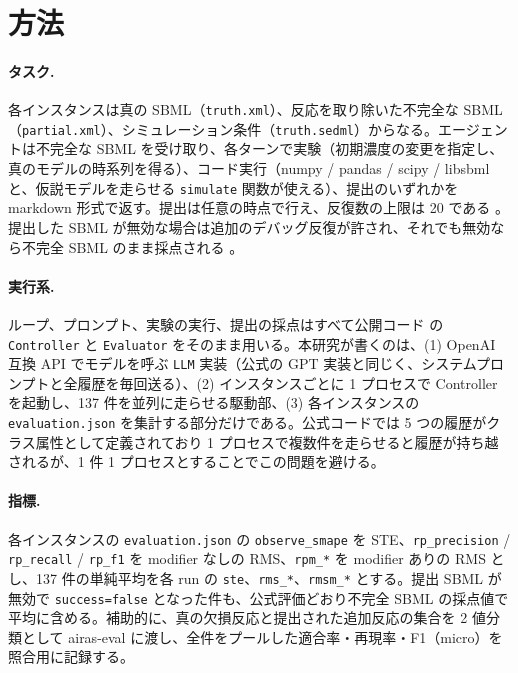 \documentclass{article}
\begin{document}
\section{方法}
\label{sec:method}
\paragraph{タスク.}
各インスタンスは真の SBML（\texttt{truth.xml}）、反応を取り除いた不完全な SBML（\texttt{partial.xml}）、シミュレーション条件（\texttt{truth.sedml}）からなる。エージェントは不完全な SBML を受け取り、各ターンで実験（初期濃度の変更を指定し、真のモデルの時系列を得る）、コード実行（numpy / pandas / scipy / libsbml と、仮説モデルを走らせる \texttt{simulate} 関数が使える）、提出のいずれかを markdown 形式で返す。提出は任意の時点で行え、反復数の上限は 20 である \cite[s1.p3]{duan-2025-measuring}。提出した SBML が無効な場合は追加のデバッグ反復が許され、それでも無効なら不完全 SBML のまま採点される \cite[s1.p4]{duan-2025-measuring}。

\paragraph{実行系.}
ループ、プロンプト、実験の実行、提出の採点はすべて公開コード \citep{h4duan-2025-scigym} の \texttt{Controller} と \texttt{Evaluator} をそのまま用いる。本研究が書くのは、(1) OpenAI 互換 API でモデルを呼ぶ \texttt{LLM} 実装（公式の GPT 実装と同じく、システムプロンプトと全履歴を毎回送る）、(2) インスタンスごとに 1 プロセスで Controller を起動し、137 件を並列に走らせる駆動部、(3) 各インスタンスの \texttt{evaluation.json} を集計する部分だけである。公式コードでは 5 つの履歴がクラス属性として定義されており 1 プロセスで複数件を走らせると履歴が持ち越されるが、1 件 1 プロセスとすることでこの問題を避ける。

\paragraph{指標.}
各インスタンスの \texttt{evaluation.json} の \texttt{observe\_smape} を STE、\texttt{rp\_precision} / \texttt{rp\_recall} / \texttt{rp\_f1} を modifier なしの RMS、\texttt{rpm\_*} を modifier ありの RMS とし、137 件の単純平均を各 run の \texttt{ste}、\texttt{rms\_*}、\texttt{rmsm\_*} とする。提出 SBML が無効で \texttt{success=false} となった件も、公式評価どおり不完全 SBML の採点値で平均に含める。補助的に、真の欠損反応と提出された追加反応の集合を 2 値分類として airas-eval に渡し、全件をプールした適合率・再現率・F1（micro）を照合用に記録する。
\end{document}
